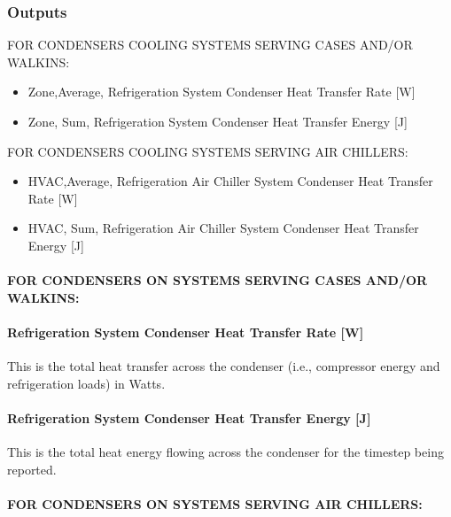 \subsubsection{Outputs}\label{outputs-9-007}

FOR CONDENSERS COOLING SYSTEMS SERVING CASES AND/OR WALKINS:

\begin{itemize}
\item
  Zone,Average, Refrigeration System Condenser Heat Transfer Rate {[}W{]}
\item
  Zone, Sum, Refrigeration System Condenser Heat Transfer Energy {[}J{]}
\end{itemize}

FOR CONDENSERS COOLING SYSTEMS SERVING AIR CHILLERS:

\begin{itemize}
\item
  HVAC,Average, Refrigeration Air Chiller System Condenser Heat Transfer Rate {[}W{]}
\item
  HVAC, Sum, Refrigeration Air Chiller System Condenser Heat Transfer Energy {[}J{]}
\end{itemize}

\paragraph{FOR CONDENSERS ON SYSTEMS SERVING CASES AND/OR WALKINS:}\label{for-condensers-on-systems-serving-cases-andor-walkins-3}

\paragraph{Refrigeration System Condenser Heat Transfer Rate {[}W{]}}\label{refrigeration-system-condenser-heat-transfer-rate-w-3}

This is the total heat transfer across the condenser (i.e., compressor energy and refrigeration loads) in Watts.

\paragraph{Refrigeration System Condenser Heat Transfer Energy {[}J{]}}\label{refrigeration-system-condenser-heat-transfer-energy-j-3}

This is the total heat energy flowing across the condenser for the timestep being reported.

\paragraph{FOR CONDENSERS ON SYSTEMS SERVING AIR CHILLERS:}\label{for-condensers-on-systems-serving-air-chillers-3}


